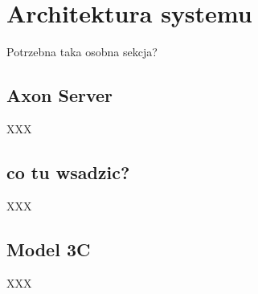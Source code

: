 \clearpage %

\section{Architektura systemu}

Potrzebna taka osobna sekcja?

\subsection{Axon Server}

XXX

\subsection{co tu wsadzic?}

XXX

\subsection{Model 3C}

XXX